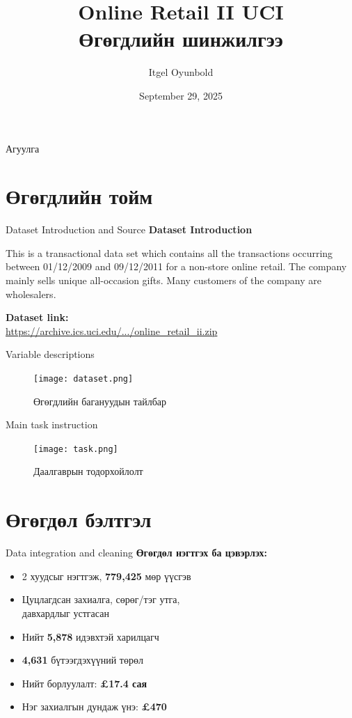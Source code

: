 \documentclass{beamer}
\title{Online Retail II UCI\\Өгөгдлийн шинжилгээ}
\author{Itgel Oyunbold}
\institute{MCS сонгон шалгаруулалт}
\date{September 29, 2025}
\begin{document}
\begin{frame}
  \titlepage
\end{frame}

\begin{frame}{Агуулга}
  \tableofcontents
\end{frame}

\section{Өгөгдлийн тойм}

\begin{frame}{Dataset Introduction and Source}
\small
\textbf{Dataset Introduction}

This is a transactional data set which contains all the transactions occurring between 01/12/2009 and 09/12/2011 for a non-store online retail. The company mainly sells unique all-occasion gifts. Many customers of the company are wholesalers.

\vspace{0.3cm}

\textbf{Dataset link:}\\
\scriptsize\href{https://archive.ics.uci.edu/static/public/502/online\%2Bretail\%2Bii.zip}{https://archive.ics.uci.edu/.../online\_retail\_ii.zip}
\end{frame}

\begin{frame}{Variable descriptions}
\begin{figure}
    \centering
    \texttt{[image: dataset.png]}
    \caption{Өгөгдлийн багануудын тайлбар}
\end{figure}
\end{frame}

\begin{frame}{Main task instruction}
\begin{figure}
    \centering
    \texttt{[image: task.png]}
    \caption{Даалгаврын тодорхойлолт}
\end{figure}
\end{frame}

\section{Өгөгдөл бэлтгэл}

\begin{frame}{Data integration and cleaning}
\small
\textbf{Өгөгдөл нэгтгэх ба цэвэрлэх:}
\begin{itemize}
    \item 2 хуудсыг нэгтгэж, \textbf{779,425} мөр үүсгэв
    \item Цуцлагдсан захиалга, сөрөг/тэг утга,\\давхардлыг устгасан
    \item Нийт \textbf{5,878} идэвхтэй харилцагч
    \item \textbf{4,631} бүтээгдэхүүний төрөл
    \item Нийт борлуулалт: \textbf{£17.4 сая}
    \item Нэг захиалгын дундаж үнэ: \textbf{£470}
\end{itemize}
\end{frame}
\end{document}
